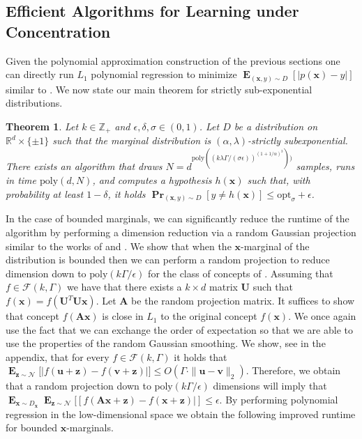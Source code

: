 \documentclass[10pt,a4paper]{article}
\newtheorem{theorem}{Theorem}[section]
\newcommand\twonorm[1]{\|#1\|_2}
\renewcommand\vec[1]{\mathbf{#1}}
\DeclareMathOperator*{\pr}{\mathbf{Pr}}
\DeclareMathOperator*{\E}{\mathbf{E}}
\newcommand{\normal}{\mathcal{N}}
\newcommand{\R}{\mathbb{R}}
\newcommand{\eps}{\epsilon}
\newcommand{\poly}{\mathrm{poly}}
\newcommand{\opt}{\mathrm{opt}}
\newcommand{\D}{D}
\newcommand{\1}{\Ind}
\newcommand{\x}{\vec x}
\newcommand{\vv}{\vec v}
\newcommand{\vu}{\vec u}
\newcommand{\z}{\vec z}
\newcommand{\Gauss}{\mathcal{N}}
\newcommand{\Djoint}{D}
\begin{document}
\subsection{Efficient Algorithms for Learning under Concentration}
\label{sec:efficient-algorithms}

Given the polynomial approximation construction of the previous sections one can directly
run $L_1$ polynomial regression to minimize $\E_{(\x, y)\sim D}[ |p(\x) - y|]$ similar to \cite{KKMS:05}.
We now state our main theorem for strictly sub-exponential distributions.
\begin{theorem}
\label{thm:smooth_learning_subgaussian-main}
    Let $k \in \mathbb Z_+$ and $\epsilon, \delta,\sigma \in (0,1)$.  Let $D$ be a distribution on $\R^{d}\times \{\pm 1\}$ such that the marginal distribution is $(\alpha,\lambda)$-strictly subexponential. There exists an algorithm that draws $N = d^{\poly((k\lambda\Gamma/(\sigma\epsilon))^{(1+1/\alpha)^3}))}$ samples, runs in time $\poly(d,N)$, and computes a hypothesis $h(\x)$ such that, with probability at least $1-\delta$, it holds  
    $ \pr_{(\x, y) \sim \Djoint}[y\neq h(\x)] \le \opt_\sigma + \eps  $.
\end{theorem}

In the case of bounded marginals, we can significantly reduce the runtime of the algorithm
by performing a dimension reduction via a random Gaussian projection similar to the
works of \cite{ArriagaVempala:99} and \cite{klivans-servedio-margin}.   We show that 
when the $\x$-marginal of the distribution is bounded then we can perform a random projection
to reduce dimension down to $\poly(k \Gamma/\eps)$ for the class of concepts of .  Assuming that $f\in \mathcal F(k, \Gamma)$ we have that there exists a $k\times d$ matrix 
$\vec U$ such that $f(\x) = f(\vec U^T \vec U \x)$.  Let $\vec A$ be the random projection matrix.
It suffices to show that concept $f(\vec A \vec x)$ is close in $L_1$ to the original concept $f(\x)$. 
We once again use the fact that we can exchange the order of expectation so that we are able to use
the properties of the random Gaussian smoothing.  We show, see  in the appendix, that for every $f \in \mathcal{F}(k, \Gamma)$ it holds that 
    $\E_{\z\sim \Gauss}\bigl[|f(\vu+\z)-f(\vv+\z)|\bigr]\leq O(\Gamma\cdot\twonorm{\vu-\vv})$.
    Therefore, we obtain that a random projection down to $\poly(k\Gamma/\epsilon)$ dimensions will imply
    that $\E_{\x \sim \D_\x}\E_{\vec z \sim \normal}[[f(\vec A \vec x+ \vec z) - f(\vec \x + \vec \z)|] \leq \eps$. By performing polynomial regression in the low-dimensional space we obtain the following improved
    runtime for bounded $\x$-marginals.
\end{document}
